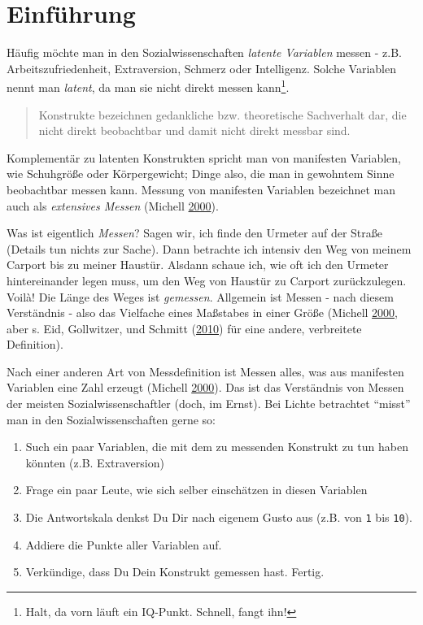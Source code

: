 \documentclass[12pt,ngerman,]{book}
\providecommand{\tightlist}{%
  \setlength{\itemsep}{0pt}\setlength{\parskip}{0pt}}
\let\rmarkdownfootnote\footnote%
\def\footnote{\protect\rmarkdownfootnote}
\theoremstyle{definition}
\theoremstyle{definition}
\theoremstyle{remark}
\begin{document}
\section{Einführung}\label{einfuhrung}

Häufig möchte man in den Sozialwissenschaften \emph{latente
Variablen} messen - z.B. Arbeitszufriedenheit,
Extraversion, Schmerz oder Intelligenz. Solche Variablen nennt man
\emph{latent}, da man sie nicht direkt messen kann\footnote{Halt, da
  vorn läuft ein IQ-Punkt. Schnell, fangt ihn!}.

\begin{quote}
Konstrukte bezeichnen gedankliche bzw. theoretische Sachverhalt dar, die
nicht direkt beobachtbar und damit nicht direkt messbar sind.
\end{quote}

Komplementär zu latenten Konstrukten spricht man von manifesten
Variablen, wie Schuhgröße oder Körpergewicht; Dinge also, die man in
gewohntem Sinne beobachtbar messen kann. Messung von manifesten
Variablen bezeichnet man auch als \emph{extensives Messen} (Michell
\protect\hyperlink{ref-Michell2000}{2000}).

Was ist eigentlich \emph{Messen}? Sagen wir, ich finde den
Urmeter auf der Straße (Details tun nichts zur Sache). Dann betrachte
ich intensiv den Weg von meinem Carport bis zu meiner Haustür. Alsdann
schaue ich, wie oft ich den Urmeter hintereinander legen muss, um den
Weg von Haustür zu Carport zurückzulegen. Voilà! Die Länge des Weges ist
\emph{gemessen}. Allgemein ist Messen - nach diesem Verständnis - also
das Vielfache eines Maßstabes in einer Größe (Michell
\protect\hyperlink{ref-Michell2000}{2000}, aber s. Eid, Gollwitzer, und
Schmitt (\protect\hyperlink{ref-eid2010statistik}{2010}) für eine
andere, verbreitete Definition).

Nach einer anderen Art von Messdefinition ist Messen alles, was aus
manifesten Variablen eine Zahl erzeugt (Michell
\protect\hyperlink{ref-Michell2000}{2000}). Das ist das Verständnis von
Messen der meisten Sozialwissenschaftler (doch, im Ernst). Bei Lichte
betrachtet ``misst'' man in den Sozialwissenschaften gerne so:

\begin{enumerate}
\def\labelenumi{\arabic{enumi}.}
\tightlist
\item
  Such ein paar Variablen, die mit dem zu messenden Konstrukt zu tun
  haben könnten (z.B. Extraversion)
\item
  Frage ein paar Leute, wie sich selber einschätzen in diesen Variablen
\item
  Die Antwortskala denkst Du Dir nach eigenem Gusto aus (z.B. von
  \texttt{1} bis \texttt{10}).
\item
  Addiere die Punkte aller Variablen auf.
\item
  Verkündige, dass Du Dein Konstrukt gemessen hast. Fertig.
\end{enumerate}
\end{document}
